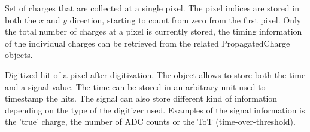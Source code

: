 Set of charges that are collected at a single pixel. The pixel indices are stored in both the $x$ and $y$ direction, starting to count from zero from the first pixel. Only the total number of charges at a pixel is currently stored, the timing information of the individual charges can be retrieved from the related PropagatedCharge objects.

Digitized hit of a pixel after digitization. The object allows to store both the time and a signal value. The time can be stored in an arbitrary unit used to timestamp the hits. The signal can also store different kind of information depending on the type of the digitizer used. Examples of the signal information is the 'true' charge, the number of ADC counts or the ToT (time-over-threshold).
